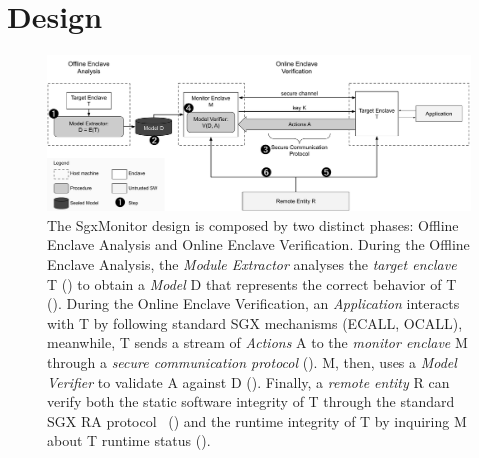\section{Design}
\label{sec:system-design_sgxmonitor}

\begin{figure}[t]
	\centering
		
    \includegraphics[width=\linewidth]{fig_c6/design.pdf}
    \caption[SgxMonitor design.]{The SgxMonitor design is composed by two 
    	distinct phases: Offline Enclave Analysis and Online Enclave 
    	Verification.
    	During the Offline Enclave Analysis, the \emph{Module Extractor} 
    	analyses 
    	the \emph{target enclave} T (\circled[1]) to obtain a \emph{Model} D 
    	that 
    	represents the correct behavior of T (\circled[2]).
    	During the Online Enclave Verification, an \emph{Application} 
    	interacts 	
    	with T by following standard SGX mechanisms (\eg ECALL, OCALL), 
    	meanwhile, 
    	T sends a stream of \emph{Actions} A to the \emph{monitor enclave} M 
    	through a \emph{secure communication protocol} (\circled[3]). 
    	M, then, uses a \emph{Model Verifier} to validate A against D 
    	(\circled[4]).
    	Finally, a \emph{remote entity} R can verify both the static software 
    	integrity of T through the standard SGX RA 							
    	protocol~\citep{anati2013innovative} (\circled[5]) and the runtime 
    	integrity of T by inquiring M about T runtime status (\circled[6]).}
    \label{fig:design_sgxmonitor}
\end{figure}


